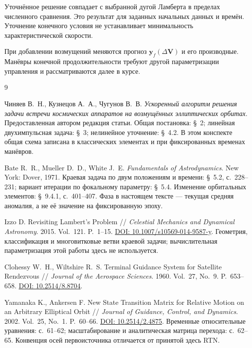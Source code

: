 \documentclass[a4paper,11pt]{article}
\numberwithin{equation}{section}
\theoremstyle{remark}
\newcommand{\vect}[1]{\boldsymbol{#1}}
\begin{document}
Уточнённое решение совпадает с выбранной дугой Ламберта
в пределах численного сравнения. Это результат для заданных
начальных данных и времён. Уточнение конечного условия
не устанавливает минимальность характеристической скорости.

При добавлении возмущений меняются прогноз
$\vect y_f(\Delta\vect V)$ и его производные.
Манёвры конечной продолжительности требуют другой
параметризации управления и рассматриваются далее в курсе.

\clearpage
\begin{thebibliography}{9}
Чиняев В.~Н., Кузнецов А.~А., Чугунов В.~В.
\textit{Ускоренный алгоритм решения задачи встречи
космических аппаратов на возмущённых эллиптических орбитах}.
Предоставленная автором редакция статьи.
Общая постановка: \S~2; линейная двухимпульсная задача:
\S~3; нелинейное уточнение: \S~4.2.
В этом конспекте общая схема записана в классических элементах
и при фиксированных временах манёвров.

Bate R.~R., Mueller D.~D., White J.~E.
\textit{Fundamentals of Astrodynamics}.
New York: Dover, 1971.
Краевая задача по двум положениям и времени:
\S~5.2, с.~228--231; вариант итерации по фокальному
параметру: \S~5.4. Изменение орбитальных элементов:
\S~9.4.1, с.~401--407.
Фаза в настоящем тексте --- текущая средняя аномалия,
а не её значение на фиксированную эпоху.

Izzo D. Revisiting Lambert's Problem //
\textit{Celestial Mechanics and Dynamical Astronomy}.
2015. Vol.~121. P.~1--15.
\href{https://doi.org/10.1007/s10569-014-9587-y}
{DOI: 10.1007/s10569-014-9587-y}.
Геометрия, классификация и многовитковые ветви
краевой задачи; вычислительная параметризация
этой работы здесь не используется.

Clohessy W.~H., Wiltshire R.~S.
Terminal Guidance System for Satellite Rendezvous //
\textit{Journal of the Aerospace Sciences}.
1960. Vol.~27, No.~9. P.~653--658.
\href{https://doi.org/10.2514/8.8704}{DOI: 10.2514/8.8704}.

Yamanaka K., Ankersen F.
New State Transition Matrix for Relative Motion
on an Arbitrary Elliptical Orbit //
\textit{Journal of Guidance, Control, and Dynamics}.
2002. Vol.~25, No.~1. P.~60--66.
\href{https://doi.org/10.2514/2.4875}{DOI: 10.2514/2.4875}.
Временные относительные уравнения: с.~61--62;
масштабирование и аналитическая матрица перехода:
с.~62--65. Конвенция осей первоисточника
отличается от принятой здесь RTN.


\end{thebibliography}
\end{document}
